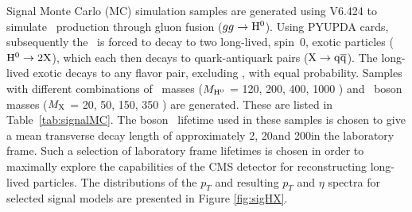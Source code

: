 Signal Monte Carlo (MC) simulation samples are generated using \PYTHIA V6.424 \cite{PYTHIA} to
simulate \Higgs~production through gluon fusion ($gg \to \Higgs$). Using \PYTHIA PYUPDA cards,
subsequently the \Higgs~is forced to decay to two long-lived, spin~0, exotic particles
($\Higgs \to 2\X$), which each then decays to quark-antiquark pairs ($\X \to \qq$).
The long-lived exotic \X decays to any flavor \qq pair, excluding \ttbar, with equal probability. Samples
with different combinations of \Higgs~masses ($M_{\mathrm{H}^{0}}$ = 120, 200, 400, 1000 \GeV ) and \X~boson masses
($M_{\mathrm{X}}$ = 20, 50, 150, 350 \GeV) are generated. These are listed in Table~\ref{tab:signalMC}. The
\X boson ~lifetime used in these samples is chosen to give a mean transverse decay length of approximately
2\cm, 20\cm and 200\cm in the laboratory frame. Such a selection of laboratory frame lifetimes is chosen in 
order to maximally explore the capabilities of the CMS detector for reconstructing long-lived particles.
The distributions of the \Higgs $p_T$ and resulting \X $p_T$ and $\eta$ spectra for selected signal
models are presented in Figure \ref{fig:sigHX}.

